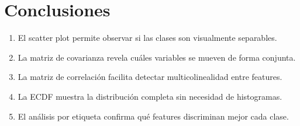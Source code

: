 \documentclass[12pt,a4paper]{article}
\begin{document}
\section{Conclusiones}
\begin{enumerate}
  \item El scatter plot permite observar si las clases son visualmente separables.
  \item La matriz de covarianza revela cu\'ales variables se mueven de forma conjunta.
  \item La matriz de correlaci\'on facilita detectar multicolinealidad entre features.
  \item La ECDF muestra la distribuci\'on completa sin necesidad de histogramas.
  \item El an\'alisis por etiqueta confirma qu\'e features discriminan mejor cada clase.
\end{enumerate}
\end{document}
